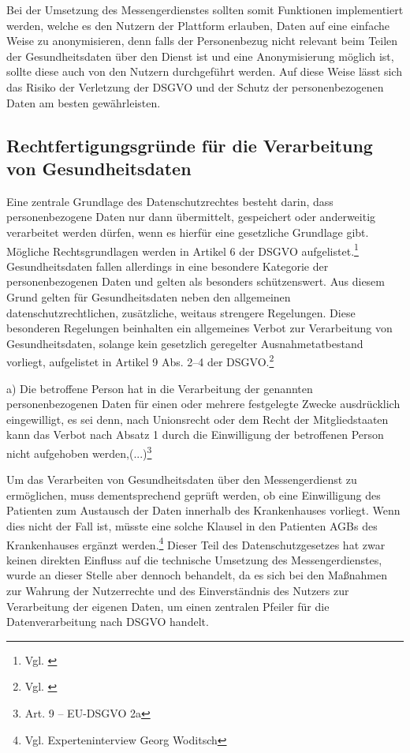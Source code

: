 Bei der Umsetzung des Messengerdienstes sollten somit Funktionen implementiert werden, welche es den Nutzern der Plattform erlauben, Daten auf eine einfache Weise zu anonymisieren, denn falls der Personenbezug nicht relevant beim Teilen der Gesundheitsdaten über den Dienst ist und eine Anonymisierung möglich ist, sollte diese auch von den Nutzern durchgeführt werden. Auf diese Weise lässt sich das Risiko der Verletzung der DSGVO und der Schutz der personenbezogenen Daten am besten gewährleisten.

\subsection{Rechtfertigungsgründe für die Verarbeitung von Gesundheitsdaten}\label{subsection:rfdvvg}
Eine zentrale Grundlage des Datenschutzrechtes besteht darin, dass personenbezogene Daten nur dann übermittelt, gespeichert oder anderweitig verarbeitet werden dürfen, wenn es hierfür eine gesetzliche Grundlage gibt. Mögliche Rechtsgrundlagen werden in Artikel 6 der DSGVO aufgelistet.\footnote{Vgl. \cite[S. 5 f.]{Bundesaerztekammer2020}} Gesundheitsdaten fallen allerdings in eine besondere Kategorie der personenbezogenen Daten und gelten als besonders schützenswert. Aus diesem Grund gelten für Gesundheitsdaten neben den allgemeinen datenschutzrechtlichen, zusätzliche, weitaus strengere Regelungen. Diese besonderen Regelungen beinhalten ein allgemeines Verbot zur Verarbeitung von Gesundheitsdaten, solange kein gesetzlich geregelter Ausnahmetatbestand vorliegt, aufgelistet in Artikel 9 Abs. 2–4 der DSGVO.\footnote{Vgl. \cite[S. 20 ff.]{Bundesaerztekammer2020}}

\glqq a) Die betroffene Person hat in die Verarbeitung der genannten personenbezogenen Daten für einen oder mehrere festgelegte Zwecke ausdrücklich eingewilligt, es sei denn, nach Unionsrecht oder dem Recht der Mitgliedstaaten kann das Verbot nach Absatz 1 durch die Einwilligung der betroffenen Person nicht aufgehoben werden,(...)\grqq{}\footnote{Art. 9 – EU-DSGVO 2a}

Um das Verarbeiten von Gesundheitsdaten über den Messengerdienst zu ermöglichen, muss dementsprechend geprüft werden, ob eine Einwilligung des Patienten zum Austausch der Daten innerhalb des Krankenhauses vorliegt. Wenn dies nicht der Fall ist, müsste eine solche Klausel in den Patienten AGBs des Krankenhauses ergänzt werden.\footnote{Vgl. Experteninterview Georg Woditsch} Dieser Teil des Datenschutzgesetzes hat zwar keinen direkten Einfluss auf die technische Umsetzung des Messengerdienstes, wurde an dieser Stelle aber dennoch behandelt, da es sich bei den Maßnahmen zur Wahrung der Nutzerrechte und des Einverständnis des Nutzers zur Verarbeitung der eigenen Daten, um einen zentralen Pfeiler für die Datenverarbeitung nach DSGVO handelt.

